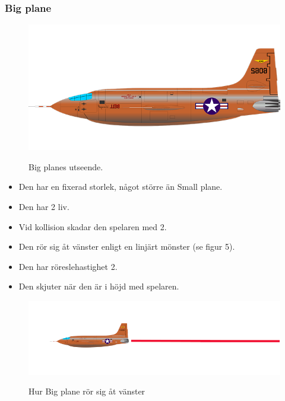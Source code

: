 \documentclass{TDP005mall}
\begin{document}
\subsubsection*{Big plane}
\begin{figure}[h!]
  \centering
  \includegraphics[scale=0.2]{Images/Enemy2.png}
  \label{}
  \caption{Big planes utseende.}
\end{figure}
\begin{itemize}
\item Den har en fixerad storlek, något större än Small plane.
\item Den har 2 liv.
\item Vid kollision skadar den spelaren med 2.
\item Den rör sig åt vänster enligt en linjärt mönster (se figur 5).
\item Den har röreslehastighet 2.
\item Den skjuter när den är i höjd med spelaren.
\end{itemize}
\begin{figure}[h!]
  \centering
  \includegraphics[scale=0.4]{Images/Enemy2-movement.png}
  \label{}
  \caption{Hur Big plane rör sig åt vänster}
\end{figure}

\newpage
\end{document}
